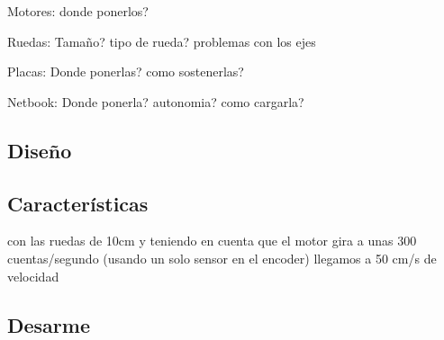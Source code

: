 Motores:
donde ponerlos?

Ruedas:
Tama\~no? tipo de rueda? problemas con los ejes

Placas:
Donde ponerlas? como sostenerlas?

Netbook:
Donde ponerla? autonomia? como cargarla?


\subsection{Dise\~no}
\label{h_prototipo_diseno}

\subsection{Caracter\'isticas}
\label{h_prototipo_caracteristicas}

con las ruedas de 10cm y teniendo en cuenta que el motor gira a unas 300 cuentas/segundo (usando un solo sensor en el encoder) llegamos a 50 cm/s de velocidad

\subsection{Desarme}
\label{h_prototipo_desarme}



